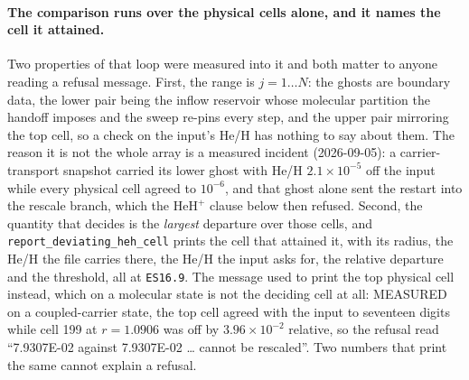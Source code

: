 \documentclass[english,a4paper]{my_memo}
\begin{document}
\paragraph{The comparison runs over the physical cells alone, and it names
the cell it attained.} Two properties of that loop were measured into it and
both matter to anyone reading a refusal message. First, the range is
$j = 1 \ldots N$: the ghosts are boundary data, the lower pair being the
inflow reservoir whose molecular partition the handoff imposes and the sweep
re-pins every step, and the upper pair mirroring the top cell, so a check on
the input's He/H has nothing to say about them. The reason it is not the
whole array is a measured incident (2026-09-05): a carrier-transport
snapshot carried its lower ghost with He/H $2.1\times10^{-5}$ off the input
while every physical cell agreed to $10^{-6}$, and that ghost alone sent the
restart into the rescale branch, which the $\mathrm{HeH^+}$ clause below
then refused. Second, the quantity that decides is the \emph{largest}
departure over those cells, and \verb|report_deviating_heh_cell| prints the
cell that attained it, with its radius, the He/H the file carries there, the
He/H the input asks for, the relative departure and the threshold, all at
\verb|ES16.9|. The message used to print the top physical cell instead,
which on a molecular state is not the deciding cell at all: MEASURED on a
coupled-carrier state, the top cell agreed with the input to seventeen
digits while cell 199 at $r = 1.0906$ was off by $3.96\times10^{-2}$
relative, so the refusal read ``7.9307E-02 against 7.9307E-02 \ldots{}
cannot be rescaled''. Two numbers that print the same cannot explain a
refusal.
\end{document}
